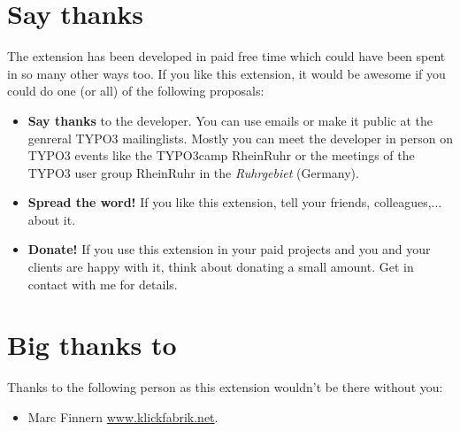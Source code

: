 \documentclass[a4paper,10pt,english]{sphinxtypo3manual}
\begin{document}
\section{Say thanks}
\label{index:authors-webpage}\label{index:say-thanks}
The extension has been developed in paid free time which
could have been spent in so many other ways too. If you like this
extension, it would be awesome if you could do one (or all) of the
following proposals:
\begin{itemize}
\item {} 
\textbf{Say thanks} to the developer. You can use emails or make it public at
the genreral TYPO3 mailinglists. Mostly you can meet the developer in person
on TYPO3 events like the TYPO3camp RheinRuhr or the meetings of the TYPO3
user group RheinRuhr in the \emph{Ruhrgebiet} (Germany).

\item {} 
\textbf{Spread the word!} If you like this extension, tell your friends,
colleagues,... about it.

\item {} 
\textbf{Donate!} If you use this extension in your paid projects and you and your
clients are happy with it, think about donating a small amount.
Get in contact with me for details.

\end{itemize}


\section{Big thanks to}
\label{index:big-thanks-to}
Thanks to the following person as this extension wouldn't be there without you:
\begin{itemize}
\item {} 
Marc Finnern \href{http://www.klickfabrik.net/}{www.klickfabrik.net}.

\end{itemize}



\renewcommand{\indexname}{Index}
\printindex
\end{document}
